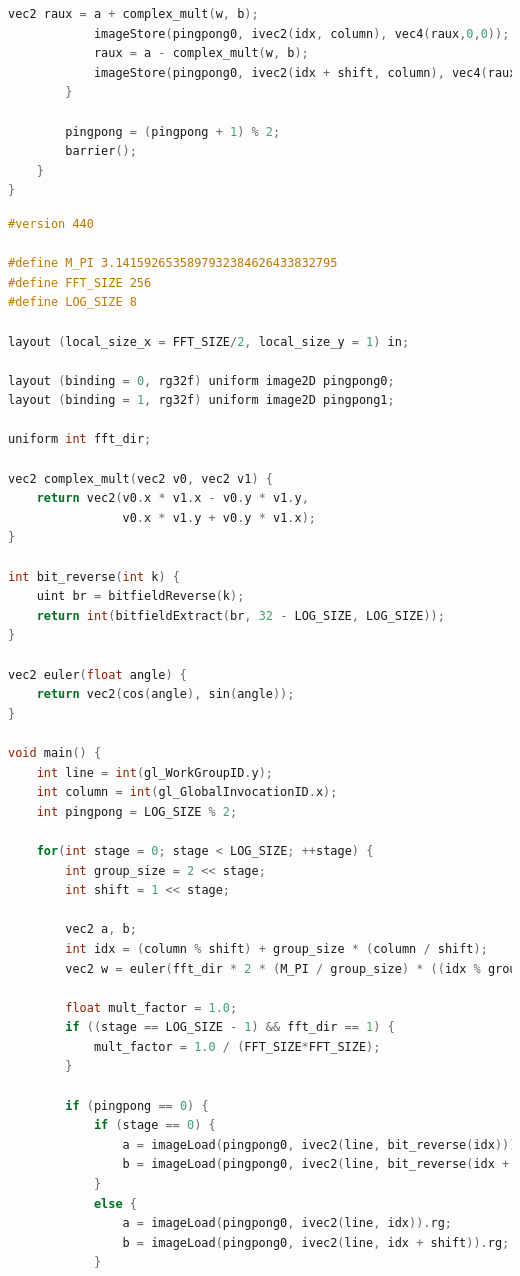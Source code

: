 \documentclass[
  oneside,
  11pt, a4paper,
  footinclude=true,
  headinclude=true,
  cleardoublepage=empty
]{scrbook}
\begin{document}
\begin{lstlisting}[language=C,caption={FFT Radix-2 Cooley-Tukey Horizontal unique pass, see \autoref{subsec:all-stages-in-one-pass}},label={lst:glsl-radix2-ct-unique-horizontal}]
            vec2 raux = a + complex_mult(w, b);
            imageStore(pingpong0, ivec2(idx, column), vec4(raux,0,0));
            raux = a - complex_mult(w, b);
            imageStore(pingpong0, ivec2(idx + shift, column), vec4(raux,0,0));
        }

        pingpong = (pingpong + 1) % 2;
        barrier();
    }
}
\end{lstlisting}

\begin{lstlisting}[language=C,caption={FFT Radix-2 Cooley-Tukey Vertical unique pass, see \autoref{subsec:all-stages-in-one-pass}},label={lst:glsl-radix2-ct-unique-vertical}]
#version 440

#define M_PI 3.1415926535897932384626433832795
#define FFT_SIZE 256
#define LOG_SIZE 8

layout (local_size_x = FFT_SIZE/2, local_size_y = 1) in;

layout (binding = 0, rg32f) uniform image2D pingpong0;
layout (binding = 1, rg32f) uniform image2D pingpong1;

uniform int fft_dir;

vec2 complex_mult(vec2 v0, vec2 v1) {
	return vec2(v0.x * v1.x - v0.y * v1.y,
				v0.x * v1.y + v0.y * v1.x);
}

int bit_reverse(int k) {
    uint br = bitfieldReverse(k);
    return int(bitfieldExtract(br, 32 - LOG_SIZE, LOG_SIZE));
}

vec2 euler(float angle) {
	return vec2(cos(angle), sin(angle));
}

void main() {
	int line = int(gl_WorkGroupID.y);
	int column = int(gl_GlobalInvocationID.x);
    int pingpong = LOG_SIZE % 2;

    for(int stage = 0; stage < LOG_SIZE; ++stage) {
        int group_size = 2 << stage;
        int shift = 1 << stage;
        
        vec2 a, b;
        int idx = (column % shift) + group_size * (column / shift);
        vec2 w = euler(fft_dir * 2 * (M_PI / group_size) * ((idx % group_size) % shift));

        float mult_factor = 1.0;
        if ((stage == LOG_SIZE - 1) && fft_dir == 1) {
            mult_factor = 1.0 / (FFT_SIZE*FFT_SIZE);
        }

        if (pingpong == 0) {
            if (stage == 0) {
                a = imageLoad(pingpong0, ivec2(line, bit_reverse(idx))).rg;
                b = imageLoad(pingpong0, ivec2(line, bit_reverse(idx + shift))).rg;
            }
            else {
                a = imageLoad(pingpong0, ivec2(line, idx)).rg;
                b = imageLoad(pingpong0, ivec2(line, idx + shift)).rg;
            }


\end{lstlisting}
\end{document}
